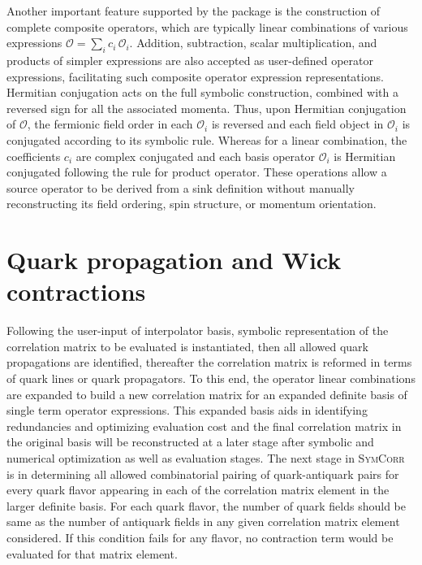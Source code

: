 \documentclass[a4paper,fleqn]{cas-dc}
\begin{document}
Another important feature supported by the package is the construction of complete composite operators, which are typically linear combinations of various expressions $\mathcal O =\sum_i c_i\,\mathcal O_i$. Addition, subtraction, scalar multiplication, and products of simpler expressions are also accepted as user-defined operator expressions, facilitating such composite operator expression representations. Hermitian conjugation acts on the full symbolic construction, combined with a reversed sign for all the associated momenta. Thus, upon Hermitian conjugation of $\mathcal O$, the fermionic field order in each $\mathcal O_i$ is reversed and each field object in $\mathcal O_i$ is conjugated according to its symbolic rule. Whereas for a linear combination, the coefficients $c_i$ are complex conjugated and each basis operator $\mathcal O_i$ is Hermitian conjugated following the rule for product operator. These operations allow a source operator to be derived from a sink definition without manually reconstructing its field ordering, spin structure, or momentum orientation.

\section{Quark propagation and Wick contractions}
\label{sec:wick}

Following the user-input of interpolator basis, symbolic representation of the correlation matrix to be evaluated is instantiated, then all allowed quark propagations are identified, thereafter the correlation matrix is reformed in terms of quark lines or quark propagators. To this end, the operator linear combinations are expanded to build a new correlation matrix for an expanded definite basis of single term operator expressions. This expanded basis aids in identifying redundancies and optimizing evaluation cost and the final correlation matrix in the original basis will be reconstructed at a later stage after symbolic and numerical optimization as well as evaluation stages. The next stage in \textsc{SymCorr} is in determining all allowed combinatorial pairing of quark-antiquark pairs for every quark flavor appearing in each of the correlation matrix element in the larger definite basis. For each quark flavor, the number of quark fields should be same as the number of antiquark fields in any given correlation matrix element considered. If this condition fails for any flavor, no contraction term would be evaluated for that matrix element. 
\end{document}
